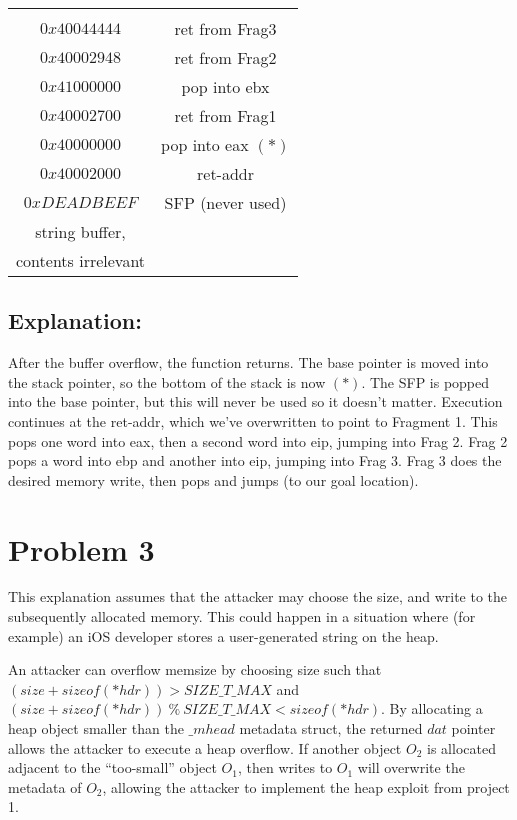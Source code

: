 \documentclass{article}
\begin{document}
\begin{tabular}{|c|c}
                  \cline{1-1}

               &  \\\cline{1-1}
$0x40044444$   & ret from Frag3 \\\cline{1-1}
$0x40002948$   & ret from Frag2 \\\cline{1-1}
$0x41000000$   & pop into ebx \\\cline{1-1}
$0x40002700$   & ret from Frag1 \\\cline{1-1}
$0x40000000$   & pop into eax $(*)$\\\cline{1-1}
$0x40002000$   & ret-addr   \\\cline{1-1}
$0xDEADBEEF$   & SFP (never used)  \\\cline{1-1}
string buffer, \\
contents irrelevant & \\\cline{1-1}
\end{tabular}

\subsection*{Explanation:}

After the buffer overflow, the function returns. The base pointer is moved into the stack pointer, so the bottom of the stack is now $(*)$. The SFP is popped into the base pointer, but this will never be used so it doesn't matter. Execution continues at the ret-addr, which we've overwritten to point to Fragment 1. This pops one word into eax, then a second word into eip, jumping into Frag 2. Frag 2 pops a word into ebp and another into eip, jumping into Frag 3. Frag 3 does the desired memory write, then pops and jumps (to our goal location).

\newpage
\section*{Problem 3}

This explanation assumes that the attacker may choose the size, and write to the subsequently allocated memory. This could happen in a situation where (for example) an iOS developer stores a user-generated string on the heap.

An attacker can overflow memsize by choosing size such that $(size + sizeof(*hdr)) > SIZE\_T\_MAX$ and $(size + sizeof(*hdr))~ \% ~SIZE\_T\_MAX < sizeof(*hdr)$. By allocating a heap object smaller than the $\_mhead$ metadata struct, the returned $dat$ pointer allows the attacker to execute a heap overflow. If another object $O_2$ is allocated adjacent to the ``too-small'' object $O_1$, then writes to $O_1$ will overwrite the metadata of $O_2$, allowing the attacker to implement the heap exploit from project 1.
\end{document}
